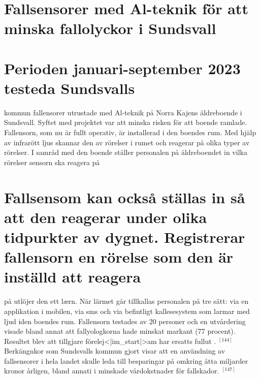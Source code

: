 {{{{{{{{{{{{{{\section*{Fallsensorer med Al-teknik för att minska fallolyckor i Sundsvall}
\section*{Perioden januari-september 2023 testeda Sundsvalls} kommun fallensorer utrustade med Al-teknik på
Norra Kajens äldreboende i Sundsvall. Syftet med projektet var att minska risken för att boende ramlade. Fallensorn, som nu är fullt operativ, är installerad i den boendes rum. Med hjälp av infrarött ljus skannar den av rörelser i rumet och reagerar på olika typer av rörelser. I samråd med den boende ställer personalen på äldreboendet in vilka rörelser sensorn ska reagera på
\section*{Fallsensom kan också ställas in så att den reagerar under olika tidpurkter av dygnet. Registrerar fallensorn en rörelse som den är inställd att reagera}
på utlöjer den ett lærn. När lärmet går tillkallas personalen på tre sätt: via en applikation i mobilen, via sms och via befintligt kallesesystem som larmar med ljud iden boendes rum. Fallensorn testades av 20 personer och en utvårdering visade bland annat att fallyologkorna hade minskat markant (77 procent). Resultet blev att tillgjare förelej<|im_start|>am har ersatts fullut . \({ }^{[144]}\)
Berkängnkor som Sundsvalls kommun gjort visar att en användning av fallsensorer i hela landet skulle leda till besparingar på omkring åtta miljarder kronor årligen, bland annati i minskade vårdokstnader för fallskador. \({ }^{[147]}\)
}}}}}}}}}}}}}}
